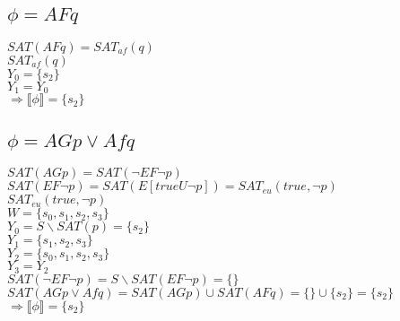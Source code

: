 \documentclass[a4paper,10pt]{article}
\begin{document}
\subsection*{$\phi = AFq$}
\hspace*{5mm}$SAT(AFq) = SAT_{af}(q)$ 
\\[0.25cm] 
\hspace*{5mm}$SAT_{af}(q)$ 
\\[0.25cm] 
\hspace*{10mm}$Y_0 = \{s_2\}$
\\[0.25cm] 
\hspace*{10mm}$Y_1 = Y_0$ 
\\[0.25cm] 
\hspace*{5mm} $\Rightarrow \llbracket \phi \rrbracket = \{s_2\}$


\subsection*{$\phi = AGp \vee Afq$}
\hspace*{5mm}$SAT(AGp) = SAT(\neg EF \neg p)$ 
\\[0.25cm] 
\hspace*{5mm}$SAT(EF \neg p) = SAT(E[trueU \neg p]) = SAT_{eu}(true, \neg p)$ 
\\[0.25cm] 
\hspace*{5mm}$SAT_{eu}(true, \neg p)$ 
\\[0.25cm] 
\hspace*{10mm}$W = \{s_0,s_1,s_2,s_3\}$
\\[0.25cm] 
\hspace*{10mm}$Y_0 = S \backslash SAT(p) = \{s_2\}$
\\[0.25cm] 
\hspace*{10mm}$Y_1 = \{s_1,s_2,s_3\}$
\\[0.25cm] 
\hspace*{10mm}$Y_2 = \{s_0,s_1,s_2,s_3\}$
\\[0.25cm] 
\hspace*{10mm}$Y_3 = Y_2$
\\[0.25cm] 
\hspace*{5mm}$SAT(\neg EF \neg p) = S \backslash SAT( EF \neg p) = \{\}$ 
\\[0.25cm] 
\hspace*{5mm}$SAT(AGp \vee Afq) = SAT(AGp) \cup SAT(AFq) = \{\} \cup \{s_2\} = \{s_2\}$
\\[0.25cm] 
\hspace*{5mm} $\Rightarrow \llbracket \phi \rrbracket = \{s_2\}$
\end{document}
